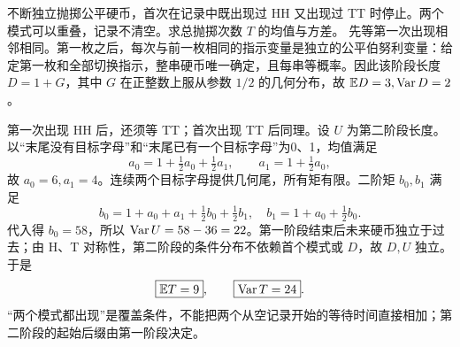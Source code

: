 不断独立抛掷公平硬币，首次在记录中既出现过 HH 又出现过 TT 时停止。两个模式可以重叠，记录不清空。求总抛掷次数 $T$ 的均值与方差。
\solution 先等第一次出现相邻相同。第一枚之后，每次与前一枚相同的指示变量是独立的公平伯努利变量：给定第一枚和全部切换指示，整串硬币唯一确定，且每串等概率。因此该阶段长度 $D=1+G$，其中 $G$ 在正整数上服从参数 $1/2$ 的几何分布，故 $\mathbb{E} D=3,\operatorname{Var} D=2$。

第一次出现 HH 后，还须等 TT；首次出现 TT 后同理。设 $U$ 为第二阶段长度。以“末尾没有目标字母”和“末尾已有一个目标字母”为0、1，均值满足
\[
 a_0=1+\tfrac12a_0+\tfrac12a_1,\qquad
 a_1=1+\tfrac12a_0,
\]
故 $a_0=6,a_1=4$。连续两个目标字母提供几何尾，所有矩有限。二阶矩 $b_0,b_1$ 满足
\[
 b_0=1+a_0+a_1+\tfrac12b_0+\tfrac12b_1,
 \quad b_1=1+a_0+\tfrac12b_0.
\]
代入得 $b_0=58$，所以 $\operatorname{Var} U=58-36=22$。第一阶段结束后未来硬币独立于过去；由 H、T 对称性，第二阶段的条件分布不依赖首个模式或 $D$，故 $D,U$ 独立。于是
\[
 \boxed{\mathbb{E} T=9},\qquad \boxed{\operatorname{Var} T=24}.
\]
\insight “两个模式都出现”是覆盖条件，不能把两个从空记录开始的等待时间直接相加；第二阶段的起始后缀由第一阶段决定。
